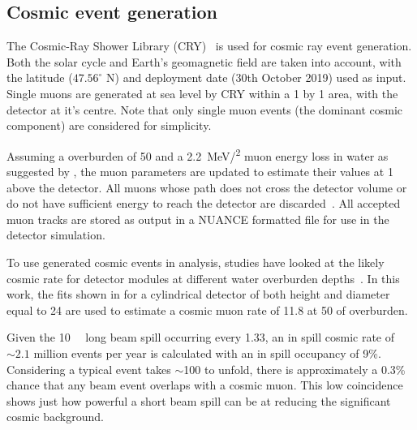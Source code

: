 \subsection{Cosmic event generation} %
\label{sec:chips_monte_carlo_cosmic} %

The Cosmic-Ray Shower Library (CRY)~\cite{hagmann2012_1, hagmann2012_2} is used for cosmic ray
event generation. Both the solar cycle and Earth's geomagnetic field are taken into account, with
the \mbox{\chipsfive} latitude ($47.56^{\circ}$ N) and deployment date (30th October 2019) used as
input. Single muons are generated at sea level by CRY within a \SI{1}{} by
\SI{1}{} area, with the detector at it's centre. Note that only single muon events (the
dominant cosmic component) are considered for simplicity.

Assuming a \chipsfive overburden of \SI{50}{} and a \SI{2.2}{\MeV/^{2}} muon
energy loss in water as suggested by , the muon parameters are updated
to estimate their values at \SI{1}{} above the detector. All muons whose path does not
cross the detector volume or do not have sufficient energy to reach the detector are
discarded~\cite{chipsgen2020}. All accepted muon tracks are stored as output in a NUANCE formatted
file for use in the detector simulation.

To use generated cosmic events in analysis, studies have looked at the likely cosmic rate for
\chips detector modules at different water overburden depths~\cite{son2013}. In this work, the
fits shown in  for a cylindrical detector of both height and diameter
equal to \SI{24}{} are used to estimate a \chipsfive cosmic muon rate of
\SI{11.8}{} at \SI{50}{} of overburden.

Given the \SI{10}{\micro{}} long \numi beam spill occurring every \SI{1.33}{},
an in spill cosmic rate of $\sim2.1$ million events per year is calculated with an in spill
occupancy of 9\%. Considering a typical event takes $\sim$\SI{100}{} to unfold, there is
approximately a 0.3\% chance that any beam event overlaps with a cosmic muon. This low coincidence
shows just how powerful a short beam spill can be at reducing the significant cosmic background.


